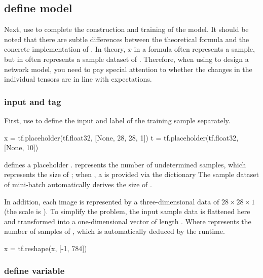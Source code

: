 \begin{content}
\begin{content}
\subsection{define model}

Next, use \tf{} to complete the construction and training of the model. It should be noted that there are subtle differences between the theoretical formula and the concrete implementation of \tf{}. In theory, $x$ in a formula often represents a sample, but  in \tf{} often represents a sample dataset of . Therefore, when using \tf{} to design a network model, you need to pay special attention to whether the changes in the individual tensors are in line with expectations.

\subsubsection{input and tag}

First, use  to define the input and label of the training sample separately.

\begin{leftbar}
\begin{python}
x = tf.placeholder(tf.float32, [None, 28, 28, 1])
t = tf.placeholder(tf.float32, [None, 10])
\end{python}
\end{leftbar}

 defines a placeholder .  represents the number of undetermined samples, which represents the size of ; when , a \ascii is provided via the  dictionary The sample dataset of {mini-batch} automatically derives the size of .

In addition, each image is represented by a three-dimensional data of $ 28 \times 28 \times 1 $ (the scale is ). To simplify the problem, the input sample data is flattened here and transformed into a one-dimensional vector of length . Where  represents the number of samples of , which is automatically deduced by the runtime.

\begin{leftbar}
\begin{python}
x = tf.reshape(x, [-1, 784])
\end{python}
\end{leftbar}

\subsubsection{define variable}


\end{content}
\end{content}
